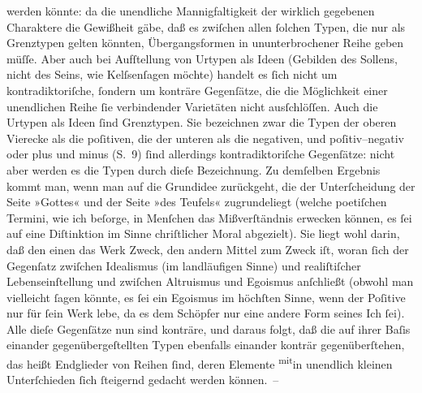\begin{ledgroupsized}[t]{13cm}
               werden könnte: da die unendliche Mannigfaltigkeit der wirklich gegebenen Charaktere
               die Gewißheit gäbe, daß es zwiſchen allen ſolchen Typen, die nur als Grenztypen
               gelten {\pb}könnten, Übergangsformen in
               ununterbrochener Reihe geben müſſe. Aber auch bei Aufſtellung von Urtypen als Ideen
               (Gebilden des Sollens, nicht des Seins, wie Kelſsenſagen möchte) handelt es ſich nicht um
               kontradiktoriſche, ſondern um konträre Gegenſätze, die die Möglichkeit einer
               unendlichen Reihe ſie verbindender Varietäten nicht ausſchlöſſen. Auch die Urtypen
               als Ideen ſind Grenztypen.\pend
           \pstart
           Sie bezeichnen zwar die Typen der oberen Vierecke als die poſitiven, die der unteren
               als die negativen, und poſitiv–negativ oder plus und
               minus (S. 9) ſind allerdings
               kontradiktoriſche Gegenſätze: nicht aber werden es die Typen durch dieſe
               Bezeichnung.\pend
           \pstart
           Zu demſelben Ergebnis kommt {\pb}man, wenn man
               auf die Grundidee zurückgeht, die der Unterſcheidung der Seite »Gottes« und der Seite
               »des Teufels« zugrundeliegt (welche poetiſchen Termini, wie ich beſorge, in Menſchen
               das Mißverſtändnis erwecken können, es ſei auf eine Diſtinktion im Sinne chriſtlicher
               Moral abgezielt). Sie liegt wohl darin, daß den einen das Werk Zweck, den andern
               Mittel zum Zweck iſt, woran ſich der Gegenſatz zwiſchen Idealismus (im landläufigen
               Sinne) und realiſtiſcher Lebenseinſtellung und zwiſchen Altruismus und Egoismus
               anſchließt (obwohl man vielleicht ſagen könnte, es ſei ein Egoismus im höchſten
               Sinne, wenn der Poſitive nur für ſein Werk lebe, da es dem Schöpfer nur eine andere
               Form seines Ich ſei). {\pb}Alle dieſe
               Gegenſätze nun sind konträre, und daraus folgt, daß die auf ihrer Baſis einander
               gegenübergeſtellten Typen ebenfalls einander konträr gegenüberſtehen, das heißt
               Endglieder von Reihen ſind, deren Elemente \substVorne{}\textsuperscript{mit}\substDazwischen{}in\substHinten{} unendlich kleinen Unterſchieden ſich ſteigernd gedacht werden können. –\pend

\end{ledgroupsized}
